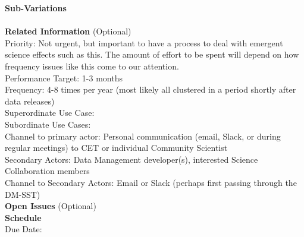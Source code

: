 {\bf Sub-Variations} \\
\\

{\bf Related Information} (Optional) \\
Priority: Not urgent, but important to have a process to deal with emergent science effects such as this.  The amount of effort to be spent will depend on how frequency issues like this come to our attention. \\
Performance Target: 1-3 months \\
Frequency: 4-8 times per year (most likely all clustered in a period shortly after data releases) \\
Superordinate Use Case:  \\
Subordinate Use Cases: \\
Channel to primary actor: Personal communication (email, Slack, or during regular meetings) to CET or individual Community Scientist \\
Secondary Actors: Data Management developer(s), interested Science Collaboration members \\
Channel to Secondary Actors: Email or Slack (perhaps first passing through the DM-SST) \\

{\bf Open Issues} (Optional) \\

{\bf Schedule} \\
Due Date: \\
